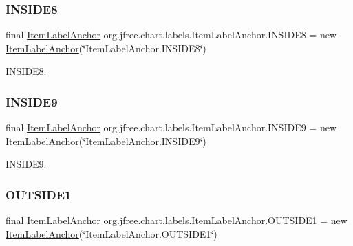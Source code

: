 \subsubsection{\texorpdfstring{I\+N\+S\+I\+D\+E8}{INSIDE8}}
{\footnotesize\ttfamily final \mbox{\hyperlink{classorg_1_1jfree_1_1chart_1_1labels_1_1_item_label_anchor}{Item\+Label\+Anchor}} org.\+jfree.\+chart.\+labels.\+Item\+Label\+Anchor.\+I\+N\+S\+I\+D\+E8 = new \mbox{\hyperlink{classorg_1_1jfree_1_1chart_1_1labels_1_1_item_label_anchor}{Item\+Label\+Anchor}}(\char`\"{}Item\+Label\+Anchor.\+I\+N\+S\+I\+D\+E8\char`\"{})\hspace{0.3cm}{\ttfamily [static]}}

I\+N\+S\+I\+D\+E8. \mbox{\label{classorg_1_1jfree_1_1chart_1_1labels_1_1_item_label_anchor_a440b823b62f1d7de9879e378122e0b4b}} 
\subsubsection{\texorpdfstring{I\+N\+S\+I\+D\+E9}{INSIDE9}}
{\footnotesize\ttfamily final \mbox{\hyperlink{classorg_1_1jfree_1_1chart_1_1labels_1_1_item_label_anchor}{Item\+Label\+Anchor}} org.\+jfree.\+chart.\+labels.\+Item\+Label\+Anchor.\+I\+N\+S\+I\+D\+E9 = new \mbox{\hyperlink{classorg_1_1jfree_1_1chart_1_1labels_1_1_item_label_anchor}{Item\+Label\+Anchor}}(\char`\"{}Item\+Label\+Anchor.\+I\+N\+S\+I\+D\+E9\char`\"{})\hspace{0.3cm}{\ttfamily [static]}}

I\+N\+S\+I\+D\+E9. \mbox{\label{classorg_1_1jfree_1_1chart_1_1labels_1_1_item_label_anchor_a940df72a6434ecb69d966e2e666d1b68}} 
\subsubsection{\texorpdfstring{O\+U\+T\+S\+I\+D\+E1}{OUTSIDE1}}
{\footnotesize\ttfamily final \mbox{\hyperlink{classorg_1_1jfree_1_1chart_1_1labels_1_1_item_label_anchor}{Item\+Label\+Anchor}} org.\+jfree.\+chart.\+labels.\+Item\+Label\+Anchor.\+O\+U\+T\+S\+I\+D\+E1 = new \mbox{\hyperlink{classorg_1_1jfree_1_1chart_1_1labels_1_1_item_label_anchor}{Item\+Label\+Anchor}}(\char`\"{}Item\+Label\+Anchor.\+O\+U\+T\+S\+I\+D\+E1\char`\"{})\hspace{0.3cm}{\ttfamily [static]}}

